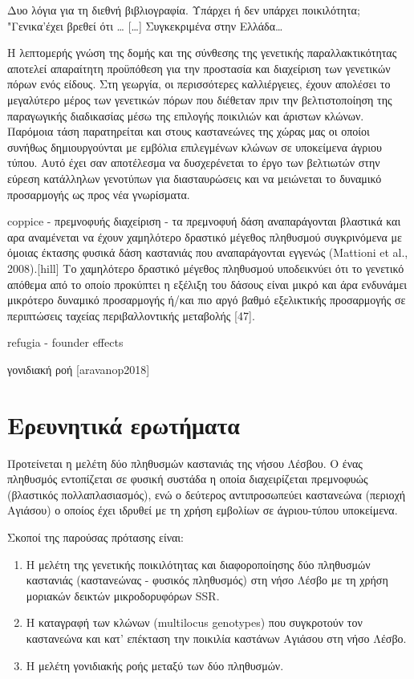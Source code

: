 \documentclass[12pt,a4paper,]{report}
\begin{document}
Δυο λόγια για τη διεθνή βιβλιογραφία. Υπάρχει ή δεν υπάρχει ποικιλότητα;
"Γενικα'έχει βρεθεί ότι \ldots{} {[}\ldots{}{]} Συγκεκριμένα στην
Ελλάδα\ldots{}

Η λεπτομερής γνώση της δομής και της σύνθεσης της γενετικής
παραλλακτικότητας αποτελεί απαραίτητη προϋπόθεση για την προστασία και
διαχείριση των γενετικών πόρων ενός είδους. Στη γεωργία, οι περισσότερες
καλλιέργειες, έχουν απολέσει το μεγαλύτερο μέρος των γενετικών πόρων που
διέθεταν πριν την βελτιστοποίηση της παραγωγικής διαδικασίας μέσω της
επιλογής ποικιλιών και άριστων κλώνων. Παρόμοια τάση παρατηρείται και
στους καστανεώνες της χώρας μας οι οποίοι συνήθως δημιουργούνται με
εμβόλια επιλεγμένων κλώνων σε υποκείμενα άγριου τύπου. Αυτό έχει σαν
αποτέλεσμα να δυσχερένεται το έργο των βελτιωτών στην εύρεση κατάλληλων
γενοτύπων για διασταυρώσεις και να μειώνεται το δυναμικό προσαρμογής ως
προς νέα γνωρίσματα.

coppice - πρεμνοφυής διαχείριση - τα πρεμνοφυή δάση αναπαράγονται
βλαστικά και αρα αναμένεται να έχουν χαμηλότερο δραστικό μέγεθος
πληθυσμού συγκρινόμενα με όμοιας έκτασης φυσικά δάση καστανιάς που
αναπαράγονται εγγενώς (Mattioni et al., 2008).{[}hill{]} Το χαμηλότερο
δραστικό μέγεθος πληθυσμού υποδεικνύει ότι το γενετικό απόθεμα από το
οποίο προκύπτει η εξέλιξη του δάσους είναι μικρό και άρα ενδυνάμει
μικρότερο δυναμικό προσαρμογής ή/και πιο αργό βαθμό εξελικτικής
προσαρμογής σε περιπτώσεις ταχείας περιβαλλοντικής μεταβολής {[}47{]}.

refugia - founder effects

γονιδιακή ροή {[}aravanop2018{]}

\hypertarget{-}{%
\section{Ερευνητικά ερωτήματα}\label{-}}

Προτείνεται η μελέτη δύο πληθυσμών καστανιάς της νήσου Λέσβου. Ο ένας
πληθυσμός εντοπίζεται σε φυσική συστάδα η οποία διαχειρίζεται πρεμνοφυώς
(βλαστικός πολλαπλασιασμός), ενώ ο δεύτερος αντιπροσωπεύει καστανεώνα
(περιοχή Αγιάσου) ο οποίος έχει ιδρυθεί με τη χρήση εμβολίων σε
άγριου-τύπου υποκείμενα.

Σκοποί της παρούσας πρότασης είναι:

\begin{enumerate}
\def\labelenumi{\arabic{enumi}.}
\item
  Η μελέτη της γενετικής ποικιλότητας και διαφοροποίησης δύο πληθυσμών
  καστανιάς (καστανεώνας - φυσικός πληθυσμός) στη νήσο Λέσβο με τη χρήση
  μοριακών δεικτών μικροδορυφόρων SSR.
\item
  Η καταγραφή των κλώνων (multilocus genotypes) που συγκροτούν τον
  καστανεώνα και κατ' επέκταση την ποικιλία καστάνων Αγιάσου στη νήσο
  Λέσβο.
\item
  Η μελέτη γονιδιακής ροής μεταξύ των δύο πληθυσμών.
\end{enumerate}
\end{document}
